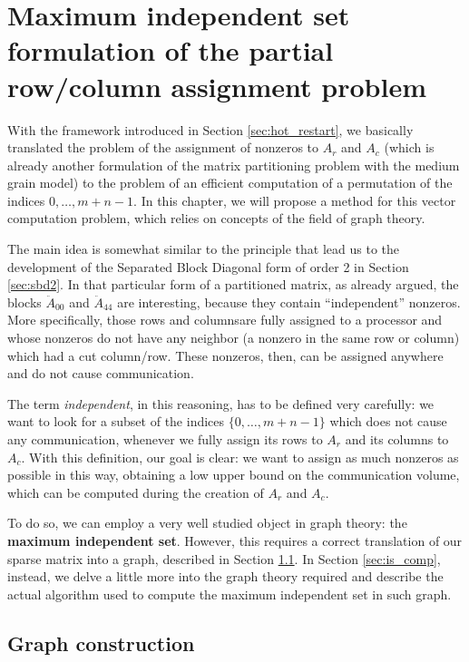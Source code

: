 \chapter{Maximum independent set formulation of the partial row/column assignment problem} \label{chap:independent_set}

With the framework introduced in Section \ref{sec:hot_restart}, we basically translated the problem of the assignment of nonzeros to $A_r$ and $A_c$ (which is already another formulation of the matrix partitioning problem with the medium grain model) to the problem of an efficient computation of a permutation of the indices $0,\dots,m+n-1$. In this chapter, we will propose a method for this vector computation problem, which relies on concepts of the field of graph theory.

The main idea is somewhat similar to the principle that lead us to the development of the Separated Block Diagonal form of order 2 in Section \ref{sec:sbd2}. In that particular form of a partitioned matrix, as already argued, the blocks $\ddot{A}_{00}$ and $\ddot{A}_{44}$ are interesting, because they contain ``independent'' nonzeros. More specifically, those rows and columnsare fully assigned to a processor and whose nonzeros do not have any neighbor (a nonzero in the same row or column) which had a cut column/row. These nonzeros, then, can be assigned anywhere and do not cause communication.

The term \emph{independent}, in this reasoning, has to be defined very carefully: we want to look for a subset of the indices $\{0,\dots,m+n-1\}$ which does not cause any communication, whenever we fully assign its rows to $A_r$ and its columns to $A_c$. With this definition, our goal is clear: we want to assign as much nonzeros as possible in this way, obtaining a low upper bound on the communication volume, which can be computed during the creation of $A_r$ and $A_c$.

To do so, we can employ a very well studied object in graph theory: the \textbf{maximum independent set}. However, this requires a correct translation of our sparse matrix into a graph, described in Section \ref{sec:is_graph}. In Section \ref{sec:is_comp}, instead, we delve a little more into the graph theory required and describe the actual algorithm used to compute the maximum independent set in such graph.

\section{Graph construction} \label{sec:is_graph}

